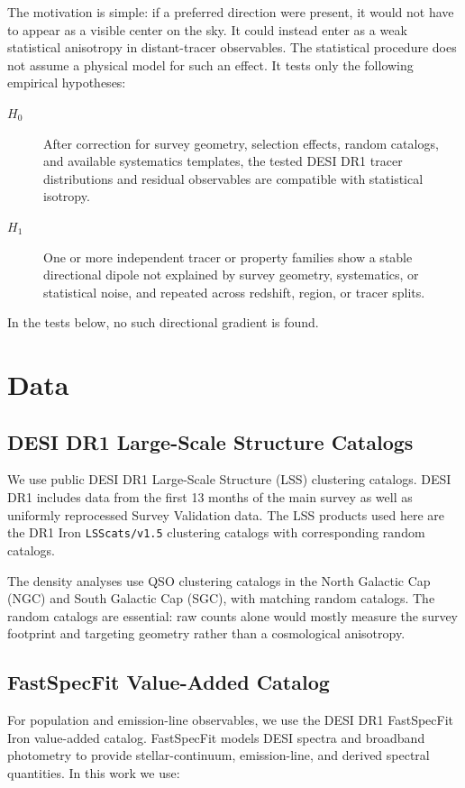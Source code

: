 \documentclass[11pt]{article}
\begin{document}
The motivation is simple: if a preferred direction were present, it would not have to appear as a visible center on the sky. It could instead enter as a weak statistical anisotropy in distant-tracer observables. The statistical procedure does not assume a physical model for such an effect. It tests only the following empirical hypotheses:

\begin{description}
    \item[$H_0$] After correction for survey geometry, selection effects, random catalogs, and available systematics templates, the tested DESI DR1 tracer distributions and residual observables are compatible with statistical isotropy.
    \item[$H_1$] One or more independent tracer or property families show a stable directional dipole not explained by survey geometry, systematics, or statistical noise, and repeated across redshift, region, or tracer splits.
\end{description}

In the tests below, no such directional gradient is found.

\section{Data}

\subsection{DESI DR1 Large-Scale Structure Catalogs}

We use public DESI DR1 Large-Scale Structure (LSS) clustering catalogs. DESI DR1 includes data from the first 13 months of the main survey as well as uniformly reprocessed Survey Validation data. The LSS products used here are the DR1 Iron \texttt{LSScats/v1.5} clustering catalogs with corresponding random catalogs.

The density analyses use QSO clustering catalogs in the North Galactic Cap (NGC) and South Galactic Cap (SGC), with matching random catalogs. The random catalogs are essential: raw counts alone would mostly measure the survey footprint and targeting geometry rather than a cosmological anisotropy.

\subsection{FastSpecFit Value-Added Catalog}

For population and emission-line observables, we use the DESI DR1 FastSpecFit Iron value-added catalog. FastSpecFit models DESI spectra and broadband photometry to provide stellar-continuum, emission-line, and derived spectral quantities. In this work we use:
\end{document}
